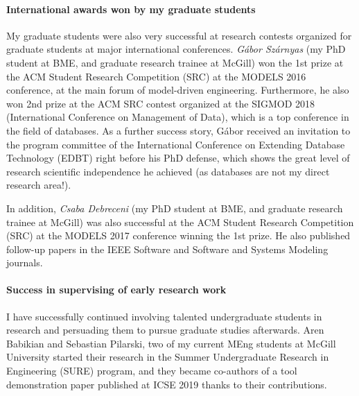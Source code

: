\documentclass[a4paper,11pt]{report}
\begin{document}
\paragraph{International awards won by my graduate students}

My graduate students were also very successful at research contests organized for graduate students at major international conferences.  \emph{Gábor Szárnyas} (my PhD student at BME,  and graduate research trainee at McGill) won the 1st prize at the ACM Student Research Competition (SRC) at the MODELS 2016 conference, at the main forum of model-driven engineering. Furthermore, he also won 2nd prize at the ACM SRC contest organized at the SIGMOD 2018 (International Conference on Management of Data), which is a top conference in the field of databases. As a further success story, Gábor received an invitation to the program committee of the International Conference on Extending Database Technology (EDBT) right before his PhD defense, which shows the great level of research scientific independence he achieved (as databases are not my direct research area!). 

In addition, \emph{Csaba Debreceni} (my PhD student at BME,  and graduate research trainee at McGill) was also successful at the ACM Student Research Competition (SRC) at the MODELS 2017 conference winning the 1st prize. He also published follow-up papers in the IEEE Software and Software and Systems Modeling journals. 


\paragraph{Success in supervising of early research work}

I have successfully continued involving talented undergraduate students in research and persuading them to pursue 
graduate studies afterwards. Aren Babikian and Sebastian Pilarski, two of my current MEng students at McGill University 
started their research in the Summer Undergraduate Research in Engineering (SURE) program, and they became co-authors 
of a tool demonstration paper \cite{icse2019-tool} published at ICSE 2019 thanks to their contributions. 



\end{document}
